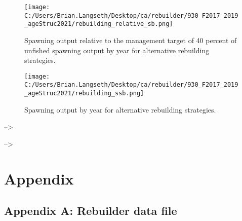 \documentclass[11pt,
  english,
  a4paper,
]{article}
\begin{document}
\tagmcend\tagstructend


\begin{figure}
\centering
\texttt{[image: C:/Users/Brian.Langseth/Desktop/ca/rebuilder/930\_F2017\_2019\_ageStruc2021/rebuilding\_relative\_sb.png]}
\caption{Spawning output relative to the management target of 40 percent of unfished spawning output by year for alternative rebuilding strategies.\label{fig:rel-ssb-fig}}
\end{figure}

\tagmcend\tagstructend


\begin{figure}
\centering
\texttt{[image: C:/Users/Brian.Langseth/Desktop/ca/rebuilder/930\_F2017\_2019\_ageStruc2021/rebuilding\_ssb.png]}
\caption{Spawning output by year for alternative rebuilding strategies.\label{fig:ssb-fig}}
\end{figure}

\tagmcend\tagstructend


--\textgreater{}

\leavevmode\tagmcend\tagstructend\par


--\textgreater{}

\leavevmode\tagmcend\tagstructend\par

\clearpage


\hypertarget{appendix}{%
\section{Appendix}\label{appendix}}

\leavevmode\tagmcend\tagstructend


\hypertarget{append_a}{%
\subsection{Appendix A: Rebuilder data file}\label{append_a}}
\end{document}
